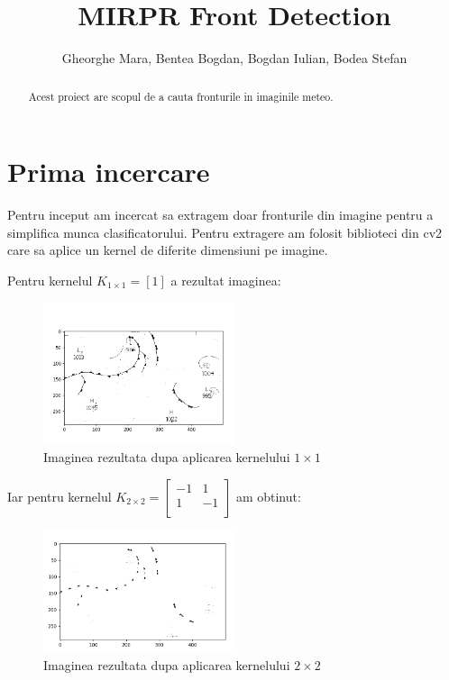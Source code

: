\documentclass{article}
\title{MIRPR Front Detection}
\author{Gheorghe Mara, Bentea Bogdan, Bogdan Iulian, Bodea Stefan}
\date{}
\begin{document}
\maketitle

\begin{abstract}
Acest proiect are scopul de a cauta fronturile in imaginile meteo.

\end{abstract}

\section{Prima incercare}

Pentru inceput am incercat sa extragem doar fronturile din imagine pentru a simplifica munca clasificatorului. Pentru extragere am folosit biblioteci din cv2 care sa aplice un kernel de diferite dimensiuni pe imagine.

Pentru kernelul {$
  K_{1\times1} =
  \left[  1\right]
$} a rezultat imaginea: 

\begin{figure}[h]
\centering
\includegraphics[width=0.5\textwidth]{first.png}
\caption{\label{fig:1}Imaginea rezultata dupa aplicarea kernelului $1\times1$}
\end{figure}

Iar pentru kernelul {$
  K_{2\times2} =
  \left[ {\begin{array}{cc}
    -1 & 1 \\
    1 & -1 \\
  \end{array} } \right]
$} am obtinut: 

\begin{figure}[h]
\centering
\includegraphics[width=0.5\textwidth]{second.png}
\caption{\label{fig:2}Imaginea rezultata dupa aplicarea kernelului $2\times2$}
\end{figure}
\end{document}
